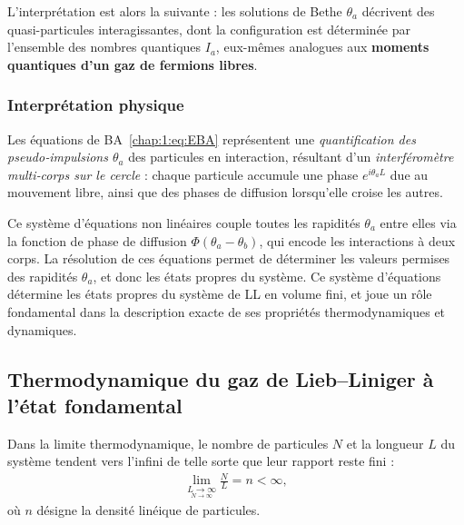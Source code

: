 \medskip

L’interprétation est alors la suivante : les solutions de Bethe ${ \theta_a }$ décrivent des quasi-particules interagissantes, dont la configuration est déterminée par l’ensemble des nombres quantiques ${ I_a }$, eux-mêmes analogues aux {\bf moments quantiques d’un gaz de fermions libres}. %




\subsubsection{Interprétation physique}

Les équations de \gls{BA}~\eqref{chap:1:eq:EBA} représentent une {\em quantification des pseudo‑impulsions $\theta_a$} des particules en interaction, résultant d’un {\em interféromètre multi‑corps sur le cercle} : chaque particule accumule une phase $e^{i \theta_a L}$ due au mouvement libre, ainsi que des phases de diffusion lorsqu’elle croise les autres.

Ce système d’équations non linéaires couple toutes les rapidités $\theta_a$ entre elles via la fonction de phase de diffusion $\Phi(\theta_a - \theta_b)$, qui encode les interactions à deux corps. La résolution de ces équations permet de déterminer les valeurs permises des rapidités $\theta_a$, et donc les états propres du système.
Ce système d'équations détermine les états propres du système de \acrlong{LL}  en volume fini, et joue un rôle fondamental dans la description exacte de ses propriétés thermodynamiques et dynamiques.


\subsection{Thermodynamique du gaz de Lieb–Liniger à l'état fondamental}

Dans la limite thermodynamique, le nombre de particules \( N \) et la longueur \( L \) du système tendent vers l'infini de telle sorte que leur rapport reste fini :
\begin{eqnarray*}
	\lim_{\underset{ N \to \infty}{L \to \infty}} \frac{N}{L} = n < \infty,
\end{eqnarray*}
où \( n \) désigne la densité linéique de particules.

